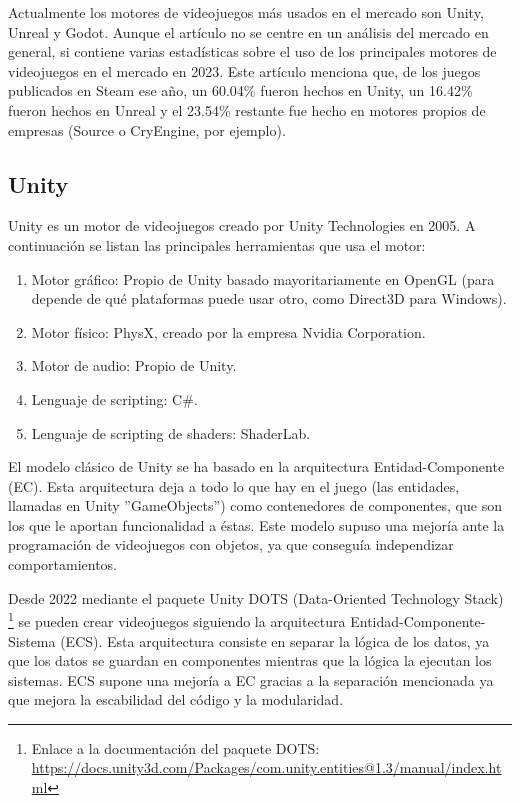 Actualmente los motores de videojuegos más usados en el mercado son Unity, Unreal y Godot.
Aunque el artículo \cite{SGE} no se centre en un análisis del mercado en general, si contiene varias estadísticas sobre el uso de los principales motores de videojuegos en el mercado en 2023.
Este artículo menciona que, de los juegos publicados en Steam ese año, un 60.04\% fueron hechos en Unity, un 16.42\% fueron hechos en Unreal y el 23.54\% restante fue hecho en motores propios de empresas (Source o CryEngine, por ejemplo).

\subsection{Unity}
Unity es un motor de videojuegos creado por Unity Technologies en 2005. A continuación se listan las principales herramientas que usa el motor:

\begin{enumerate}
    \item Motor gráfico: Propio de Unity basado mayoritariamente en OpenGL (para depende de qué plataformas puede usar otro, como Direct3D para Windows).
    \item Motor físico: PhysX, creado por la empresa Nvidia Corporation.
    \item Motor de audio: Propio de Unity.
    \item Lenguaje de scripting: C\#.
    \item Lenguaje de scripting de shaders: ShaderLab.
\end{enumerate}

El modelo clásico de Unity se ha basado en la arquitectura Entidad-Componente (EC).
Esta arquitectura deja a todo lo que hay en el juego (las entidades, llamadas en Unity ''GameObjects'') como contenedores de componentes, que son los que le aportan funcionalidad a éstas.
Este modelo supuso una mejoría ante la programación de videojuegos con objetos, ya que conseguía independizar comportamientos.

Desde 2022 mediante el paquete Unity DOTS (Data-Oriented Technology Stack) \footnote{Enlace a la documentación del paquete DOTS: \url{https://docs.unity3d.com/Packages/com.unity.entities@1.3/manual/index.html}} se pueden crear videojuegos siguiendo la arquitectura Entidad-Componente-Sistema (ECS).
Esta arquitectura consiste en separar la lógica de los datos, ya que los datos se guardan en componentes mientras que la lógica la ejecutan los sistemas.
ECS supone una mejoría a EC gracias a la separación mencionada ya que mejora la escabilidad del código y la modularidad.

